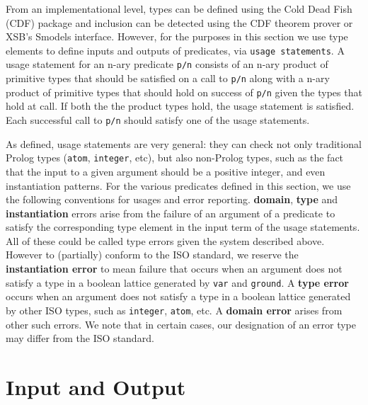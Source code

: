 {From an implementational level, types can be defined using the Cold
Dead Fish (CDF) package and inclusion can be detected using the CDF
theorem prover or XSB's Smodels interface.  However, for the
purposes in this section we use type elements to define inputs and
outputs of predicates, via {\tt usage statements}.  A usage statement
for an n-ary predicate {\tt p/n} consists of an n-ary product of
primitive types that should be satisfied on a call to {\tt p/n} along
with a n-ary product of primitive types that should hold on success of
{\tt p/n} given the types that hold at call.  If both the the product
types hold, the usage statement is satisfied.  Each successful call to
{\tt p/n} should satisfy one of the usage statements.

As defined, usage statements are very general: they can check not only
traditional Prolog types ({\tt atom}, {\tt integer}, etc), but also
non-Prolog types, such as the fact that the input to a given argument
should be a positive integer, and even instantiation patterns.  For
the various predicates defined in this section, we use the following
conventions for usages and error reporting.  {\bf domain}, {\bf type}
and {\bf instantiation} errors arise from the failure of an argument
of a predicate to satisfy the corresponding type element in the input
term of the usage statements.  All of these could be called type
errors given the system described above.  However to (partially)
conform to the ISO standard, we reserve the {\bf instantiation error}
to mean failure that occurs when an argument does not satisfy a type
in a boolean lattice generated by {\tt var} and {\tt ground}.  A {\bf
  type error} occurs when an argument does not satisfy a type in a
boolean lattice generated by other ISO types, such as {\tt integer},
{\tt atom}, etc.  A {\bf domain error} arises from other such errors.
We note that in certain cases, our designation of an error type may
differ from the ISO standard.
}

\section{Input and Output}

